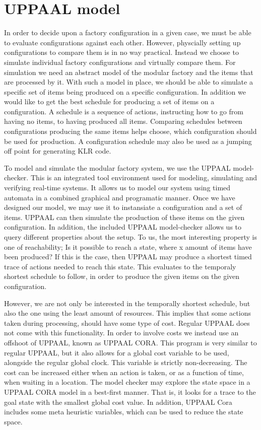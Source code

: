 \chapter{UPPAAL model}\label{ch:uppaalmodel}
In order to decide upon a factory configuration in a given case, we must be able to evaluate configurations against each other. However, physcially setting up configurations to compare them is in no way practical. Instead we choose to simulate individual factory configurations and virtually compare them. For simulation we need an abstract model of the modular factory and the items that are processed by it. With such a model in place, we should be able to simulate a specific set of items being produced on a specific configuration. In addition we would like to get the best schedule for producing a set of items on a configuration. A schedule is a sequence of actions, instructing how to go from having no items, to having produced all items. Comparing schedules between configurations producing the same items helps choose, which configuration should be used for production. A configuration schedule may also be used as a jumping off point for generating KLR code.

To model and simulate the modular factory system, we use the UPPAAL model-checker\cite{Larsen97uppaalin}. This is an integrated tool environment used for modeling, simulating and verifying real-time systems. It allows us to model our system using timed automata in a combined graphical and programatic manner. Once we have designed our model, we may use it to instansiate a configuration and a set of items. UPPAAL can then simulate the production of these items on the given configuration. In addition, the included UPPAAL model-checker allows us to query different properties about the setup. To us, the most interesting property is one of reachability; Is it possible to reach a state, where x amount of items have been produced? If this is the case, then UPPAAL may produce a shortest timed trace of actions needed to reach this state. This evaluates to the temporaly shortest schedule to follow, in order to produce the given items on the given configuration.

However, we are not only be interested in the temporally shortest schedule, but also the one using the least amount of resources. This implies that some actions taken during processing, should have some type of cost. Regular UPPAAL does not come with this functionality. In order to involve costs we instead use an offshoot of UPPAAL, known as UPPAAL CORA\cite{UPPAALCORA}. This program is very similar to regular UPPAAL, but it also allows for a global cost variable to be used, alongside the regular global clock. This variable is strictly non-decreasing. The cost can be increased either when an action is taken, or as a function of time, when waiting in a location. The model checker may explore the state space in a UPPAAL CORA model in a best-first manner. That is, it looks for a trace to the goal state with the smallest global cost value. In addition, UPPAAL Cora includes some meta heuristic variables, which can be used to reduce the state space.

